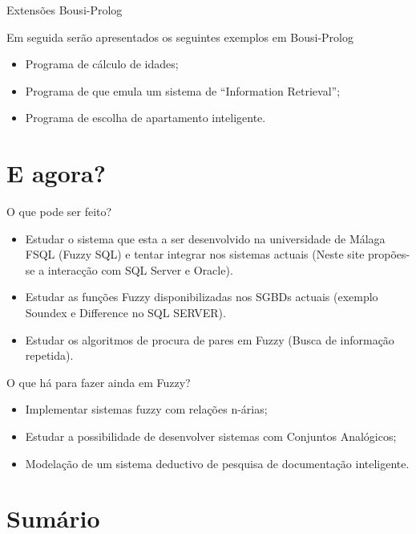 \documentclass[portuges]{beamer}
\begin{document}

\begin{frame}{Extensões Bousi-Prolog}
	\begin{example}
		Em seguida serão apresentados os seguintes exemplos em Bousi-Prolog
		\begin{itemize}
			\item Programa de cálculo de idades;
			\item Programa de que emula um sistema de ``Information Retrieval'';
			\item Programa de escolha de apartamento inteligente.
		\end{itemize}
	\end{example}
\end{frame}


\section{E agora?}

\begin{frame}{O que pode ser feito?}
	\begin{itemize}[<+->]
		\item Estudar o sistema que esta a ser desenvolvido na universidade
		de Málaga \alert{FSQL} (Fuzzy SQL) e tentar integrar nos sistemas actuais
		(Neste site propões-se a interacção com SQL Server e Oracle).
		\item Estudar as funções Fuzzy disponibilizadas nos SGBDs actuais 
		(exemplo Soundex e Difference no SQL SERVER).
		\item Estudar os algoritmos de procura de pares em Fuzzy (Busca de informação repetida).
	\end{itemize}
\end{frame}

\begin{frame}{O que há para fazer ainda em Fuzzy?}
	\begin{itemize}[<+->]
		\item Implementar sistemas fuzzy com relações n-árias;
		\item Estudar a possibilidade de desenvolver sistemas com Conjuntos Analógicos;
		\item Modelação de um sistema deductivo de pesquisa de documentação inteligente.
	\end{itemize}
\end{frame}


\section{Sumário}
\end{document}
